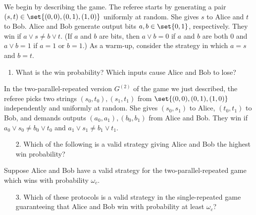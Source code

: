 \begin{exercises}
We begin by describing the game. The referee starts by generating a pair $(s,t) \in \set{(0,0),(0,1),(1,0)}$ uniformly at random. She gives $s$ to Alice and $t$ to Bob. Alice and Bob generate output bits $a,b\in\set{0,1}$, respectively. They win if $a\lor s \neq b \lor t$. (If $a$ and $b$ are bits, then $a\lor b = 0$ if $a$ and $b$ are both $0$ and $a\lor b = 1$ if $a=1$ or $b=1$.)
As a warm-up, consider the strategy in which $a = s$ and $b = t$.
\begin{enumerate}
\item What is the win probability? Which inputs cause Alice and Bob to lose?
\end{enumerate}
In the two-parallel-repeated version $G^{(2)}$ of the game we just described, the referee picks two strings $(s_0,t_0),(s_1,t_1)$ from $\set{(0,0),(0,1),(1,0)}$ independently and uniformly at random. She gives $(s_0,s_1)$ to Alice, $(t_0,t_1)$ to Bob, and demands outputs $(a_0,a_1),(b_0,b_1)$ from Alice and Bob. They win if $a_0\lor s_0 \neq b_0 \lor t_0$ and $a_1\lor s_1 \neq b_1 \lor t_1$.
\begin{enumerate}
\item[2.] Which of the following is a valid strategy giving Alice and Bob the highest win probability?
\end{enumerate}
Suppose Alice and Bob have a valid strategy for the two-parallel-repeated game which wins with probability $\omega_c$.
\begin{enumerate}
\item[3.] Which of these protocols is a valid strategy in the single-repeated game guaranteeing that Alice and Bob win with probability at least $\omega_c$?

\end{enumerate}
\end{exercises}
